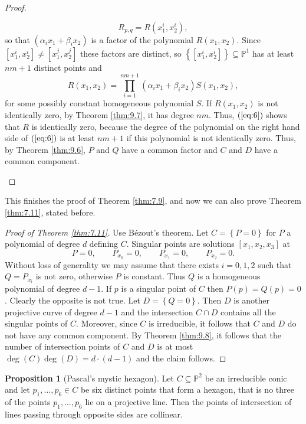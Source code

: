 \documentclass{article}
\renewcommand{\P}{\mathbb{P}}
\newcommand{\rb}[1]{\left( #1 \right)}
\renewcommand{\sb}[1]{\left[ #1 \right]}
\newcommand{\cb}[1]{\left\{ #1 \right\}}
\theoremstyle{definition}\newtheorem{definition}{Definition}[section]
\theoremstyle{definition}\newtheorem{notation}[definition]{Notation}
\theoremstyle{definition}\newtheorem{remark}[definition]{Remark}
\theoremstyle{definition}\newtheorem{example}[definition]{Example}
\theoremstyle{definition}\newtheorem{fact}{Fact}
\theoremstyle{definition}\newtheorem{exercise}{Exercise}
\newtheorem{proposition}[definition]{Proposition}
\begin{document}
\begin{proof}
\begin{enumerate}
$$ R_{p, q} = R\rb{x_1^i, x_2^i}, $$
so that $ \rb{\alpha_ix_1 + \beta_ix_2} $ is a factor of the polynomial $ R\rb{x_1, x_2} $. Since $ \sb{x_1^i, x_2^i} \ne \sb{x_1^j, x_2^j} $ these factors are distinct, so $ \cb{\sb{x_1^i, x_2^i}} \subseteq \P^1 $ has at least $ nm + 1 $ distinct points and
\begin{equation}
\label{eq:6}
R\rb{x_1, x_2} = \prod_{i = 1}^{nm + 1} \rb{\alpha_ix_1 + \beta_ix_2}S\rb{x_1, x_2},
\end{equation}
for some possibly constant homogeneous polynomial $ S $. If $ R\rb{x_1, x_2} $ is not identically zero, by Theorem \ref{thm:9.7}, it has degree $ nm $. Thus, $ \rb{\ref{eq:6}} $ shows that $ R $ is identically zero, because the degree of the polynomial on the right hand side of $ \rb{\ref{eq:6}} $ is at least $ nm + 1 $ if this polynomial is not identically zero. Thus, by Theorem \ref{thm:9.6}, $ P $ and $ Q $ have a common factor and $ C $ and $ D $ have a common component.
\end{enumerate}
\end{proof}

This finishes the proof of Theorem \ref{thm:7.9}, and now we can also prove Theorem \ref{thm:7.11}, stated before.

\begin{proof}[Proof of Theorem \ref{thm:7.11}]
Use Bézout's theorem. Let $ C = \cb{P = 0} $ for $ P $ a polynomial of degree $ d $ defining $ C $. Singular points are solutions $ \sb{x_1, x_2, x_3} $ at
$$ P = 0, \qquad P_{x_0} = 0, \qquad P_{x_1} = 0, \qquad P_{x_2} = 0. $$
Without loss of generality we may assume that there exists $ i = 0, 1, 2 $ such that $ Q = P_{x_i} $ is not zero, otherwise $ P $ is constant. Thus $ Q $ is a homogeneous polynomial of degree $ d - 1 $. If $ p $ is a singular point of $ C $ then $ P\rb{p} = Q\rb{p} = 0 $. Clearly the opposite is not true. Let $ D = \cb{Q = 0} $. Then $ D $ is another projective curve of degree $ d - 1 $ and the intersection $ C \cap D $ contains all the singular points of $ C $. Moreover, since $ C $ is irreducible, it follows that $ C $ and $ D $ do not have any common component. By Theorem \ref{thm:9.8}, it follows that the number of intersection points of $ C $ and $ D $ is at most $ \deg\rb{C}\deg\rb{D} = d \cdot \rb{d - 1} $ and the claim follows.
\end{proof}

\begin{proposition}[Pascal's mystic hexagon]
Let $ C \subseteq \P^2 $ be an irreducible conic and let $ p_1, \dots, p_6 \in C $ be six distinct points that form a hexagon, that is no three of the points $ p_1, \dots, p_6 $ lie on a projective line. Then the points of intersection of lines passing through opposite sides are collinear.
\end{proposition}
\end{document}
